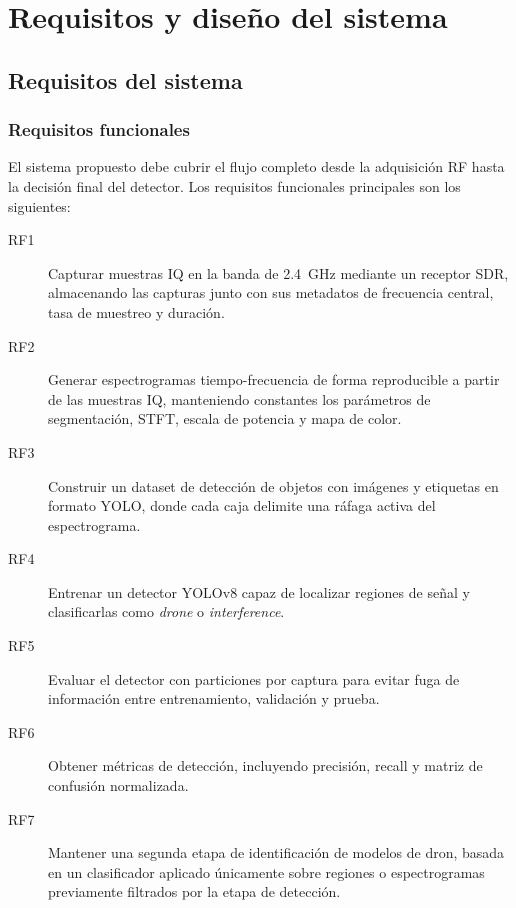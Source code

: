 \chapter{Requisitos y diseño del sistema}
\label{cap:requisitos_diseno}

\section{Requisitos del sistema}
\label{sec:requisitos}

\subsection{Requisitos funcionales}

El sistema propuesto debe cubrir el flujo completo desde la adquisición RF hasta la decisión final del detector. Los requisitos funcionales principales son los siguientes:

\begin{description}
  \item[RF1] Capturar muestras IQ en la banda de \SI{2.4}{\giga\hertz} mediante un receptor SDR, almacenando las capturas junto con sus metadatos de frecuencia central, tasa de muestreo y duración.
  \item[RF2] Generar espectrogramas tiempo-frecuencia de forma reproducible a partir de las muestras IQ, manteniendo constantes los parámetros de segmentación, STFT, escala de potencia y mapa de color.
  \item[RF3] Construir un dataset de detección de objetos con imágenes y etiquetas en formato YOLO, donde cada caja delimite una ráfaga activa del espectrograma.
  \item[RF4] Entrenar un detector YOLOv8 capaz de localizar regiones de señal y clasificarlas como \emph{drone} o \emph{interference}.
  \item[RF5] Evaluar el detector con particiones por captura para evitar fuga de información entre entrenamiento, validación y prueba.
  \item[RF6] Obtener métricas de detección, incluyendo precisión, recall y matriz de confusión normalizada.
  \item[RF7] Mantener una segunda etapa de identificación de modelos de dron, basada en un clasificador aplicado únicamente sobre regiones o espectrogramas previamente filtrados por la etapa de detección.
\end{description}

